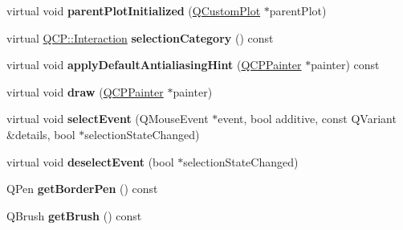 \begin{DoxyCompactItemize}
\item 
\hypertarget{classQCPLegend_a4d552c63d82742d77fb7f177bae7b1ba}{}virtual void {\bfseries parent\+Plot\+Initialized} (\hyperlink{classQCustomPlot}{Q\+Custom\+Plot} $\ast$parent\+Plot)\label{classQCPLegend_a4d552c63d82742d77fb7f177bae7b1ba}

\item 
\hypertarget{classQCPLegend_a7a9795a28c9c2514b4ae50f0a63d407c}{}virtual \hyperlink{namespaceQCP_a2ad6bb6281c7c2d593d4277b44c2b037}{Q\+C\+P\+::\+Interaction} {\bfseries selection\+Category} () const \label{classQCPLegend_a7a9795a28c9c2514b4ae50f0a63d407c}

\item 
\hypertarget{classQCPLegend_a26307f532c3458b379663b7d517a5f47}{}virtual void {\bfseries apply\+Default\+Antialiasing\+Hint} (\hyperlink{classQCPPainter}{Q\+C\+P\+Painter} $\ast$painter) const \label{classQCPLegend_a26307f532c3458b379663b7d517a5f47}

\item 
\hypertarget{classQCPLegend_a4462151bf875ca85fa3815457c683fdc}{}virtual void {\bfseries draw} (\hyperlink{classQCPPainter}{Q\+C\+P\+Painter} $\ast$painter)\label{classQCPLegend_a4462151bf875ca85fa3815457c683fdc}

\item 
\hypertarget{classQCPLegend_af93bf87dc5c383a9d2ada80b35f3a1a5}{}virtual void {\bfseries select\+Event} (Q\+Mouse\+Event $\ast$event, bool additive, const Q\+Variant \&details, bool $\ast$selection\+State\+Changed)\label{classQCPLegend_af93bf87dc5c383a9d2ada80b35f3a1a5}

\item 
\hypertarget{classQCPLegend_a5208ead4331c9b0440f768f059777c58}{}virtual void {\bfseries deselect\+Event} (bool $\ast$selection\+State\+Changed)\label{classQCPLegend_a5208ead4331c9b0440f768f059777c58}

\item 
\hypertarget{classQCPLegend_a60172c9d2212584f38f5d0c1e50970c7}{}Q\+Pen {\bfseries get\+Border\+Pen} () const \label{classQCPLegend_a60172c9d2212584f38f5d0c1e50970c7}

\item 
\hypertarget{classQCPLegend_a236fe4cd617c9f88620fd9de74417f20}{}Q\+Brush {\bfseries get\+Brush} () const \label{classQCPLegend_a236fe4cd617c9f88620fd9de74417f20}

\end{DoxyCompactItemize}
